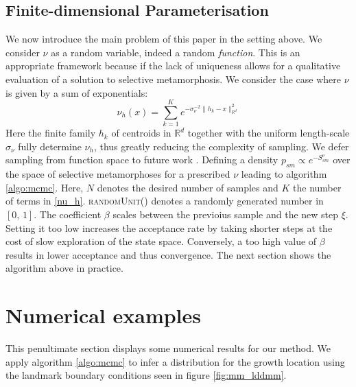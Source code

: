 \documentclass[runningheads]{llncs}
\newcommand{\Rd}{\mathbb{R}^{d}}
\begin{document}
\subsection{Finite-dimensional Parameterisation}\label{subs:finite-dim-param}


We now introduce the main problem of this paper in the setting above. We
consider $\nu$ as a random variable, indeed a random \emph{function}. This is an
appropriate framework because if the lack of uniqueness allows for a qualitative
evaluation of a solution to selective metamorphosis. We consider the case where
$\nu$ is given by a sum of exponentials:
\begin{equation}\label{nu_h}
    \nu_h (x) = \sum_{k=1}^K e^{ -\sigma_\nu^{-2}\|h_k - x\|_{\Rd}^2}
\end{equation}
Here the finite family $h_k$ of centroids in $\Rd$ together with the uniform
length-scale $\sigma_\nu$ fully determine $\nu_h$, thus greatly reducing the
complexity of sampling. We defer sampling from function space to future work
\cite{bockarnaudoncotter2019}. Defining a density $p_{sm} \propto e^{-
S_{sm}^\nu}$ over the space of selective metamorphoses for a prescribed $\nu$
leading to algorithm \ref{algo:mcmc}. Here, $N$ denotes the desired number of
samples and $K$ the number of terms in \eqref{nu_h}. \textsc{randomUnit()}
denotes a randomly generated number in $[0,\,1]$. The coefficient $\beta$ scales
between the previoius sample and the new step $\xi$. Setting it too low
increases the acceptance rate by taking shorter steps at the cost of slow
exploration of the state space. Conversely, a too high value of $\beta$ results
in lower acceptance and thus convergence. 
The next section shows the algorithm above in practice.

\section{Numerical examples}\label{sec:numerical}

This penultimate section displays some numerical results for our method. We
apply algorithm \ref{algo:mcmc} to infer a distribution for the
growth location using the landmark boundary conditions seen in figure
\ref{fig:mm_lddmm}. 
\end{document}
